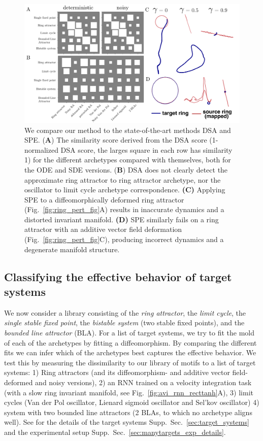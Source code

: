 \documentclass{article}
\theoremstyle{definition} \newtheorem{definition}{Definition}  \newtheorem{example}{Example}
\theoremstyle{remark} \newtheorem{remark}{Remark}
\newcounter{ct}
\begin{document}
\begin{figure}[tbhp]
    \centering
    \includegraphics[width=0.9\linewidth]{dsa_spe}
    \caption{We compare our method to the state-of-the-art methods DSA\citep{ostrow2024beyond} and SPE\citep{friedman2025characterizing}.
      (\textbf{A}) The similarity score derived from the DSA score (1-normalized DSA score, the larges square in each row has similarity 1) for the different archetypes compared with themselves, both for the ODE and SDE versions.
        (\textbf{B}) DSA does not clearly detect the approximate ring attractor to ring attractor archetype, nor the oscillator to limit cycle archetype correspondence.
\textbf{(C)} Applying SPE to a diffeomorphically deformed ring attractor (Fig.~\ref{fig:ring_pert_fig}A) results in inaccurate dynamics and a distorted invariant manifold.  
\textbf{(D)} SPE similarly fails on a ring attractor with an additive vector field deformation (Fig.~\ref{fig:ring_pert_fig}C), producing incorrect dynamics and a degenerate manifold structure.
    }
    \label{fig:dsa_spe}
\end{figure}


\subsection{Classifying the effective behavior of target systems}\label{sec:target_demonstrations}
We now consider a library consisting of the \emph{ring attractor}, the \emph{limit cycle}, the \emph{single stable fixed point}, the \emph{bistable system} (two stable fixed points), and the \emph{bounded line attractor} (BLA).
For a list of target systems, we try to fit the mold of each of the archetypes by fitting a diffeomorphism.
By comparing the different fits we can infer which of the archetypes best captures the effective behavior.
We test this by measuring the dissimilarity to our library of motifs to a list of target systems:
1) Ring attractors (and its diffeomorphism- and additive vector field-deformed and noisy versions),
2) an RNN trained on a velocity integration task (with a slow ring invariant manifold, see Fig.~\ref{fig:avi_rnn_recttanh}A),
3) limit cycles (Van der Pol oscillator, Lienard sigmoid oscillator and Sel'kov oscillator)
4) system with two bounded line attractors (2 BLAs, to which no archetype aligns well).
See for the details of the target systems Supp.~Sec.~\ref{sec:target_systems} and the experimental setup Supp.~Sec.~\ref{sec:manytargets_exp_details}.
\end{document}
